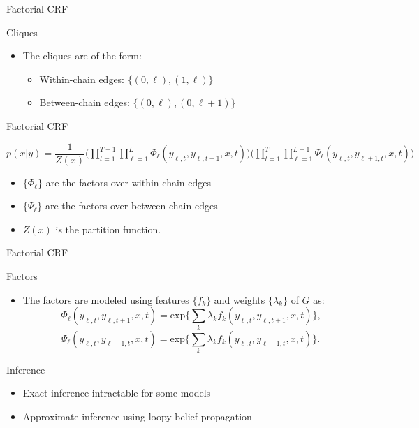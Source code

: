 \documentclass[presentation,bigger]{beamer}
\begin{document}
\begin{frame}[label={sec:orgheadline16}]{Factorial CRF}
\begin{block}{Cliques}
\begin{itemize}
\item The cliques are of the form:
\begin{itemize}
\item Within-chain edges: \text{ }\text{ }\(\{(0,\ell),(1,\ell)\}\)
\item Between-chain edges: \(\{(0,\ell),(0,\ell+1)\}\)
\end{itemize}
\end{itemize}
\end{block}
\end{frame}
\begin{frame}[label={sec:orgheadline17}]{Factorial CRF}
\begin{definition}
\(p(x|y) = \dfrac{1}{Z(x)}\Bigg(\displaystyle\prod_{t=1}^{T-1}\prod_{\ell=1}^{L}\Phi_\ell(y_{\ell,t},y_{\ell,t+1},x,t)\Bigg)\Bigg(\prod_{t=1}^{T}\prod_{\ell=1}^{L-1}\Psi_\ell(y_{\ell,t},y_{\ell+1,t},x,t)\Bigg)\)
\begin{itemize}
\item \(\{\Phi_\ell\}\) are the factors over within-chain edges
\item \(\{\Psi_\ell\}\) are the factors over between-chain edges
\item \(Z(x)\) is the partition function.
\end{itemize}
\end{definition}
\end{frame}
\begin{frame}[label={sec:orgheadline18}]{Factorial CRF}
\begin{block}{Factors}
\begin{itemize}
\item The factors are modeled using features \(\{f_k\}\) and weights \(\{\lambda_k\}\) of \(G\) as:
\[\Phi_\ell(y_{\ell,t},y_{\ell,t+1},x,t) = \text{exp}\Bigg\{\sum_k\lambda_k f_k(y_{\ell,t},y_{\ell,t+1},x,t)\Bigg\}\text{,}\]
\[\Psi_\ell(y_{\ell,t},y_{\ell+1,t},x,t) = \text{exp}\Bigg\{\sum_k\lambda_k f_k(y_{\ell,t},y_{\ell+1,t},x,t)\Bigg\}\text{.}\]
\end{itemize}
\end{block}
\end{frame}
\begin{frame}[label={sec:orgheadline19}]{Inference}
\begin{itemize}
\item Exact inference intractable for some models
\item Approximate inference using loopy belief propagation
\end{itemize}
\end{frame}
\end{document}
